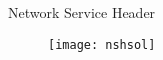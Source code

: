 \begin{frame}{Network Service Header}

  \begin{figure}
    \centering
    \texttt{[image: nshsol]}
  \end{figure}

\end{frame}